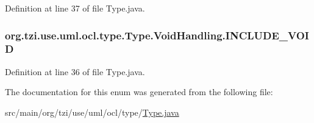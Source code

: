 Definition at line 37 of file Type.\-java.

\hypertarget{enumorg_1_1tzi_1_1use_1_1uml_1_1ocl_1_1type_1_1_type_1_1_void_handling_ab929cae19bbb0c16f007d34449832371}{
\subsubsection[{I\-N\-C\-L\-U\-D\-E\-\_\-\-V\-O\-I\-D}]{\setlength{\rightskip}{0pt plus 5cm}org.\-tzi.\-use.\-uml.\-ocl.\-type.\-Type.\-Void\-Handling.\-I\-N\-C\-L\-U\-D\-E\-\_\-\-V\-O\-I\-D}}\label{enumorg_1_1tzi_1_1use_1_1uml_1_1ocl_1_1type_1_1_type_1_1_void_handling_ab929cae19bbb0c16f007d34449832371}


Definition at line 36 of file Type.\-java.



The documentation for this enum was generated from the following file\-:\begin{DoxyCompactItemize}
\item 
src/main/org/tzi/use/uml/ocl/type/\hyperlink{_type_8java}{Type.\-java}\end{DoxyCompactItemize}
